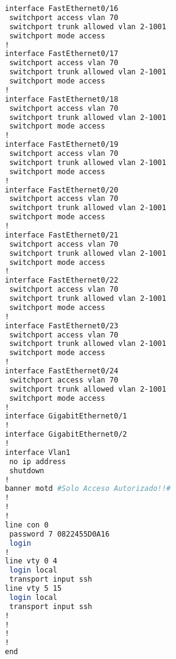\begin{lstlisting}[language=Bash, caption={Configuración Completa Switch Radiologia}]
interface FastEthernet0/16
 switchport access vlan 70
 switchport trunk allowed vlan 2-1001
 switchport mode access
!
interface FastEthernet0/17
 switchport access vlan 70
 switchport trunk allowed vlan 2-1001
 switchport mode access
!
interface FastEthernet0/18
 switchport access vlan 70
 switchport trunk allowed vlan 2-1001
 switchport mode access
!
interface FastEthernet0/19
 switchport access vlan 70
 switchport trunk allowed vlan 2-1001
 switchport mode access
!
interface FastEthernet0/20
 switchport access vlan 70
 switchport trunk allowed vlan 2-1001
 switchport mode access
!
interface FastEthernet0/21
 switchport access vlan 70
 switchport trunk allowed vlan 2-1001
 switchport mode access
!
interface FastEthernet0/22
 switchport access vlan 70
 switchport trunk allowed vlan 2-1001
 switchport mode access
!
interface FastEthernet0/23
 switchport access vlan 70
 switchport trunk allowed vlan 2-1001
 switchport mode access
!
interface FastEthernet0/24
 switchport access vlan 70
 switchport trunk allowed vlan 2-1001
 switchport mode access
!
interface GigabitEthernet0/1
!
interface GigabitEthernet0/2
!
interface Vlan1
 no ip address
 shutdown
!
banner motd #Solo Acceso Autorizado!!#
!
!
!
line con 0
 password 7 0822455D0A16
 login
!
line vty 0 4
 login local
 transport input ssh
line vty 5 15
 login local
 transport input ssh
!
!
!
!
end
\end{lstlisting}
